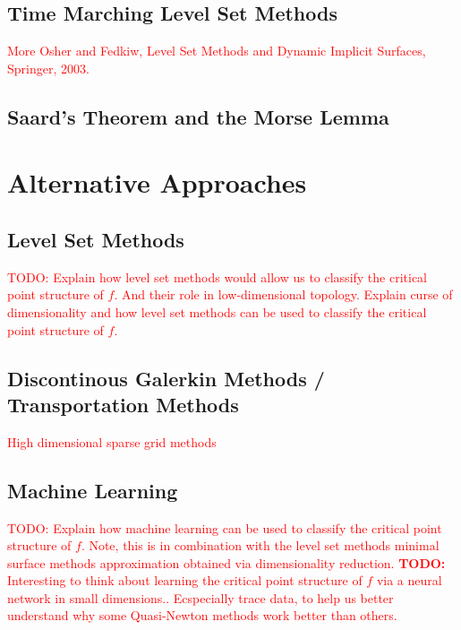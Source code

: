 \documentclass[10pt]{article}
\begin{document}
    \subsection{Time Marching Level Set Methods}
    \textcolor{Red}{
        More Osher and Fedkiw, Level Set Methods and Dynamic
        Implicit Surfaces, Springer, 2003.
    }

    \subsection{Saard's Theorem and the Morse Lemma}

    \section{Alternative Approaches}
    \subsection{Level Set Methods}
    \textcolor{Red}{
        TODO: Explain how level set methods would allow us
        to classify the critical point structure of $f$.
        And their role in low-dimensional topology.
        Explain curse of dimensionality and how level set methods
        can be used to classify the critical point structure of $f$.
    }
    
    \subsection{Discontinous Galerkin Methods / Transportation Methods}
    \textcolor{Red}{
        High dimensional sparse grid methods
    }


    \subsection{Machine Learning}
    \textcolor{Red}{
        TODO: Explain how machine learning can be used to classify
        the critical point structure of $f$.
        Note, this is in combination with the level set methods
        minimal surface methods approximation obtained via
        dimensionality reduction.
        \textbf{TODO:} Interesting to think about learning the critical
        point structure of $f$ via a neural network in small dimensions..
        Ecspecially trace data, to help us better understand why some
        Quasi-Newton methods work better than others.
    }
\end{document}
